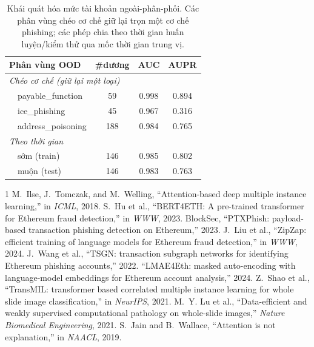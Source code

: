 \documentclass[conference]{IEEEtran}
\begin{document}
\begin{table}[t]\centering\caption{Khái quát hóa mức tài khoản ngoài-phân-phối. Các
phân vùng chéo cơ chế giữ lại trọn một cơ chế phishing; các phép chia theo thời gian
huấn luyện/kiểm thử qua mốc thời gian trung vị.}\label{tab:ood}
\begin{tabular}{lccc}\toprule
\textbf{Phân vùng OOD} & \textbf{\#dương} & \textbf{AUC} & \textbf{AUPR} \\\midrule
\multicolumn{4}{l}{\emph{Chéo cơ chế (giữ lại một loại)}}\\
\ \ payable\_function & 59 & 0.998 & 0.894 \\
\ \ ice\_phishing & 45 & 0.967 & 0.316 \\
\ \ address\_poisoning & 188 & 0.984 & 0.765 \\
\multicolumn{4}{l}{\emph{Theo thời gian}}\\
\ \ sớm (train) & 146 & 0.985 & 0.802 \\
\ \ muộn (test) & 146 & 0.983 & 0.763 \\
\bottomrule\end{tabular}\end{table}

\begin{thebibliography}{1}
 M.~Ilse, J.~Tomczak, and M.~Welling, ``Attention-based deep
multiple instance learning,'' in \emph{ICML}, 2018.
 S.~Hu et al., ``BERT4ETH: A pre-trained transformer for
Ethereum fraud detection,'' in \emph{WWW}, 2023.
 BlockSec, ``PTXPhish: payload-based transaction phishing
detection on Ethereum,'' 2023.
 J.~Liu et al., ``ZipZap: efficient training of language models for
Ethereum fraud detection,'' in \emph{WWW}, 2024.
 J.~Wang et al., ``TSGN: transaction subgraph networks for
identifying Ethereum phishing accounts,'' 2022.
 ``LMAE4Eth: masked auto-encoding with language-model embeddings
for Ethereum account analysis,'' 2024.
 Z.~Shao et al., ``TransMIL: transformer based correlated
multiple instance learning for whole slide image classification,'' in
\emph{NeurIPS}, 2021.
 M.~Y. Lu et al., ``Data-efficient and weakly supervised
computational pathology on whole-slide images,'' \emph{Nature Biomedical
Engineering}, 2021.
 S.~Jain and B.~Wallace, ``Attention is not explanation,'' in
\emph{NAACL}, 2019.
\end{thebibliography}
\end{document}
